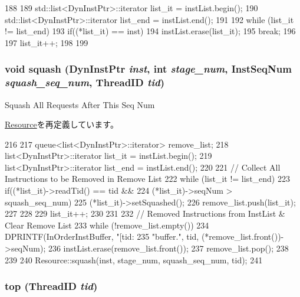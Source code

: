 \begin{DoxyCode}
188 {
189     std::list<DynInstPtr>::iterator list_it = instList.begin();
190     std::list<DynInstPtr>::iterator list_end = instList.end();
191 
192     while (list_it != list_end) {
193         if((*list_it) == inst) {
194             instList.erase(list_it);
195             break;
196         }
197         list_it++;
198     }
199 }
\end{DoxyCode}
\hypertarget{classInstBuffer_a52235c5e3d912452f254dc45f1496fd2}{
\subsubsection[{squash}]{\setlength{\rightskip}{0pt plus 5cm}void squash ({\bf DynInstPtr} {\em inst}, \/  int {\em stage\_\-num}, \/  {\bf InstSeqNum} {\em squash\_\-seq\_\-num}, \/  {\bf ThreadID} {\em tid})}}
\label{classInstBuffer_a52235c5e3d912452f254dc45f1496fd2}
Squash All Requests After This Seq Num 

\hyperlink{classResource_a52235c5e3d912452f254dc45f1496fd2}{Resource}を再定義しています。


\begin{DoxyCode}
216 {
217     queue<list<DynInstPtr>::iterator> remove_list;
218     list<DynInstPtr>::iterator list_it = instList.begin();
219     list<DynInstPtr>::iterator list_end = instList.end();
220 
221     // Collect All Instructions to be Removed in Remove List
222     while (list_it != list_end) {
223         if((*list_it)->readTid() == tid &&
224            (*list_it)->seqNum > squash_seq_num) {
225             (*list_it)->setSquashed();
226             remove_list.push(list_it);
227         }
228 
229         list_it++;
230     }
231 
232     // Removed Instructions from InstList & Clear Remove List
233     while (!remove_list.empty()) {
234         DPRINTF(InOrderInstBuffer, "[tid:%
235                 "buffer.\n", tid, (*remove_list.front())->seqNum);
236         instList.erase(remove_list.front());
237         remove_list.pop();
238     }
239 
240     Resource::squash(inst, stage_num, squash_seq_num, tid);
241 }
\end{DoxyCode}
\hypertarget{classInstBuffer_a636fc68dd4880da2b94630b1978a6e85}{
\subsubsection[{top}]{ top ({\bf ThreadID} {\em tid})}}
\label{classInstBuffer_a636fc68dd4880da2b94630b1978a6e85}



